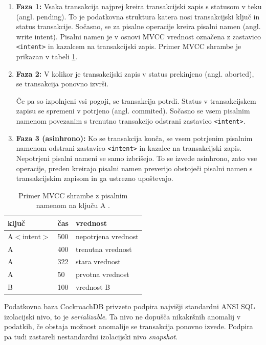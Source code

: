 \documentclass[a4paper, 12pt]{book}
\begin{document}
\begin{enumerate}
    \item \textbf{Faza 1:} Vsaka transakcija najprej kreira transakcijski zapis s statusom v teku (angl. pending). To je podatkovna struktura katera nosi transakcijski ključ in status transakcije. Sočasno, se za pisalne operacije kreira pisalni namen (angl. write intent). Pisalni namen je v osnovi MVCC vrednost označena z zastavico \texttt{<intent>} in kazalcem na transakcijski zapis. Primer MVCC shrambe je prikazan v tabeli \ref{tbl_crdb_mvcc_store}.
    \item \textbf{Faza 2:} V kolikor je transakcijski zapis v status prekinjeno (angl. aborted), se transakcija ponovno izvrši.
    
    Če pa so izpolnjeni vsi pogoji, se transakcija potrdi. Status v transakcijskem zapisu se spremeni v potrjeno (angl. commited). Sočasno se vsem pisalnim namenom povezanim s trenutno transakcijo odstrani zastavico \texttt{<intent>}. 
    \item \textbf{Faza 3 (asinhrono):} Ko se transakcija konča, se vsem potrjenim pisalnim namenom odstrani zastavico \texttt{<intent>} in kazalec na transakcijski zapis. Nepotrjeni pisalni nameni se samo izbrišejo. To se izvede asinhrono, zato vse operacije, preden kreirajo pisalni namen preverijo obstoječi pisalni namen s transakcijskim zapisom in ga ustrezno upoštevajo.
\end{enumerate}

\begin{table}[H]
\begin{center}
\begin{tabular}{ |l|l|l| } 
\hline
\textbf{ključ} & \textbf{čas} & \textbf{vrednost} \\
\hline
A$<$intent$>$ & 500 & nepotrjena vrednost \\
A & 400 & trenutna vrednost \\ 
A & 322 & stara vrednost \\ 
A & 50 & prvotna vrednost \\
B & 100 & vrednost B \\
\hline
\end{tabular}
\end{center}
\caption{Primer MVCC shrambe z pisalnim namenom na ključu A \cite{CRDB-blog-transaction-isolation}.}
\label{tbl_crdb_mvcc_store}
\end{table}

Podatkovna baza CockroachDB privzeto podpira najvišji standardni AN\-SI SQL izolacijski nivo, to je \textit{serializable}. Ta nivo ne dopušča nikakršnih anomalij v podatkih, če obstaja možnost anomalije se transakcija ponovno izvede. Podpira pa tudi zastareli nestandardni izolacijski nivo \textit{snapshot}.
\end{document}
